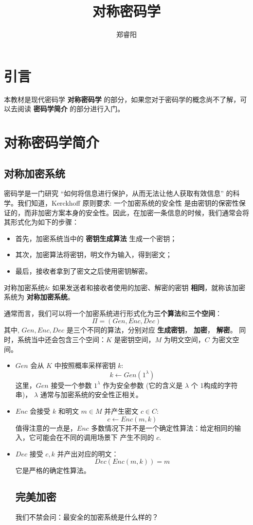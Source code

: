 \documentclass{ctexart}
\title{对称密码学}
\author{郑睿阳}
\begin{document}
\maketitle

\newpage
\tableofcontents
\newpage
\section{引言}
本教材是现代密码学 \textbf{对称密码学} 的部分，如果您对于密码学的概念尚不了解，可以去阅读 \textbf{密码学简介} 的部分进行入门。

\section{对称密码学简介}
\subsection{对称加密系统}
密码学是一门研究 “如何将信息进行保护，从而无法让他人获取有效信息” 的科学。我们知道，Kerckhoff 原则要求: 一个加密系统的安全性
是由密钥的保密性保证的，而非加密方案本身的安全性。因此，在加密一条信息的时候，我们通常会将其形式化为如下的步骤：
\begin{itemize} 
  \item 首先，加密系统当中的 \textbf{密钥生成算法} 生成一个密钥；
  \item 其次，加密算法将密钥，明文作为输入，得到密文；
  \item 最后，接收者拿到了密文之后使用密钥解密。
\end{itemize} 
\newtheorem{definition}{定义}[section]
\begin{mydefinition}{对称加密系统}&
如果发送者和接收者使用的加密、解密的密钥 \textbf{相同}，就称该加密系统为 \textbf{对称加密系统}。
\end{mydefinition}

通常而言，我们可以将一个加密系统进行形式化为\textbf{三个算法}和\textbf{三个空间}：
$$\Pi = (Gen, Enc, Dec)$$
其中, $Gen, Enc, Dec$ 是三个不同的算法，分别对应 \textbf{生成密钥}， \textbf{加密}， \textbf{解密}。
同时，系统当中还会包含三个空间：$K$ 是密钥空间，$M$ 为明文空间，$C$ 为密文空间。 
\begin{itemize} 
  \item $Gen$ 会从 $K$ 中按照概率采样密钥 $k$: $$k \leftarrow Gen(1^\lambda)$$ 
  这里，$Gen$ 接受一个参数 $1^{\lambda}$ 作为安全参数 (它的含义是 $\lambda$ 个 1构成的字符串)，
  $\lambda$ 通常与加密系统的安全性正相关。
  \item $Enc$ 会接受 $k$ 和明文 $m \in M$ 并产生密文 $c \in C$: $$ c \leftarrow Enc(m, k)$$
  值得注意的一点是，$Enc$ 多数情况下并不是一个确定性算法：给定相同的输入，它可能会在不同的调用场景下
  产生不同的 $c$.
  \item $Dec$ 接受 $c, k$ 并产出对应的明文：$$Dec(Enc(m, k)) = m$$
  它是严格的确定性算法。
\subsection{完美加密}
我们不禁会问：最安全的加密系统是什么样的？
\end{itemize} 
\end{document}
